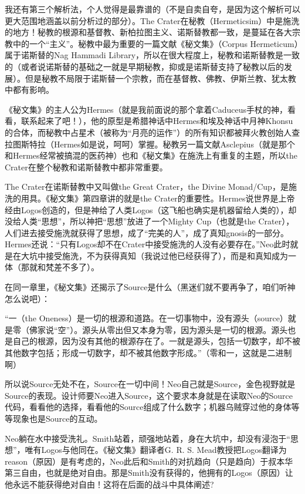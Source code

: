 \documentclass[UTF8]{ctexart}
\begin{document}
我还有第三个解析法，个人觉得是最靠谱的（不是自卖自夸，是因为这个解析可以更大范围地涵盖以前分析过的部分）。The Crater在秘教（Hermeticsim）中是施洗的地方！秘教的根源和基督教、新柏拉图主义、诺斯替教都一致，是蔓延在各大宗教中的一个“主义”。秘教中最为重要的一篇文献《秘文集》（Corpus Hermeticum）属于诺斯替的Nag Hammadi Library，所以在很大程度上，秘教和诺斯替教是一致的（或者说诺斯替的基础之一就是早期秘教，抑或是诺斯替支持了秘教以后的发展）。但是秘教不局限于诺斯替一个宗教，而在基督教、佛教、伊斯兰教、犹太教中都有影响。

《秘文集》的主人公为Hermes（就是我前面说的那个拿着Caduceus手杖的神，看看，联系起来了吧！），他的原型是希腊神话中Hermes和埃及神话中月神Khonsu的合体，而秘教中占星术（被称为“月亮的运作”）的所有知识都被拜火教创始人查拉图斯特拉（Hermes如是说，呵呵）掌握。秘教另一篇文献Asclepius（就是那个和Hermes经常被搞混的医药神）也和《秘文集》在施洗上有重复的主题，所以the Crater在整个秘教和诺斯替教中都非常重要。

The Crater在诺斯替教中又叫做the Great Crater，the Divine Monad/Cup，是施洗的用具。《秘文集》第四章讲的就是the Crater的重要性。Hermes说世界是上帝经由Logos创造的，但是神给了人类Logos（这飞船也确实是机器留给人类的），却没给人类“思想”，所以神把“思想”放进了一个Mighty Cup（也就是the Crater），人们进去接受施洗就获得了思想，成了“完美的人”，成了真知gnosis的一部分。Hermes还说：“只有Logos却不在Crater中接受施洗的人没有必要存在。”Neo此时就是在大坑中接受施洗，不为获得真知（我说过他已经获得了），而是和真知成为一体（那就和梵差不多了）。

在同一章里，《秘文集》还揭示了Source是什么（黑迷们就不要再争了，咱们听神怎么说吧）：

“一（the Oneness）是一切的根源和道路。在一切事物中，没有源头（source）就是零（佛家说“空”）。源头从零出但又本身为零，因为源头是一切的根源。源头也是自己的根源，因为没有其他的根源存在了。一就是源头，包括一切数字，却不被其他数字包括；形成一切数字，却不被其他数字形成。”（零和一，这就是二进制啊）

所以说Source无处不在，Source在一切中间！Neo自己就是Source，金色视野就是Source的表现。设计师要Neo进入Source，这个要求本身就是在读取Neo的Source代码，看看他的选择，看看他的Source组成了什么数字；机器乌贼穿过他的身体等等现象也是Source的互动。

Neo躺在水中接受洗礼。Smith站着，顽强地站着，身在大坑中，却没有浸泡于“思想”，唯有Logos与他同在。《秘文集》翻译者G. R. S. Mead教授把Logos翻译为reason（原因）是有考虑的，Neo此后和Smith的对抗趋向（只是趋向）于叔本华第三自由，也就是绝对自由。那是Smith没有获得的，他拥有的Logos（原因）让他永远不能获得绝对自由！这将在后面的战斗中具体阐述?
\end{document}
